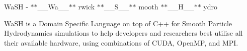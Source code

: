 Wa\+SH -\/ $\ast$$\ast$\+\_\+\+\_\+\+Wa\+\_\+\+\_\+$\ast$$\ast$ rwick $\ast$$\ast$\+\_\+\+\_\+\+S\+\_\+\+\_\+$\ast$$\ast$ mooth $\ast$$\ast$\+\_\+\+\_\+\+H\+\_\+\+\_\+$\ast$$\ast$ ydro

Wa\+SH is a Domain Specific Language on top of C++ for Smooth Particle Hydrodynamics simulations to help developers and researchers best utilise all their available hardware, using combinations of C\+U\+DA, Open\+MP, and M\+PI. 